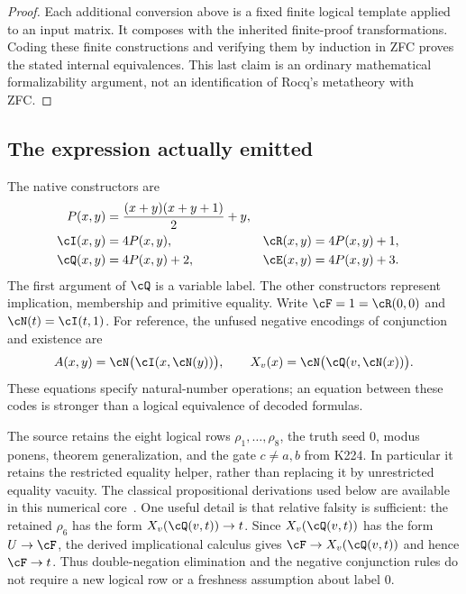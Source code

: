 \begin{proof}
Each additional conversion above is a fixed finite logical template
applied to an input matrix.  It composes with the inherited finite-proof
transformations.  Coding these finite constructions and verifying them
by induction in ZFC proves the stated internal equivalences.  This last
claim is an ordinary mathematical formalizability argument, not an
identification of Rocq's metatheory with ZFC.
\end{proof}

\subsection{The expression actually emitted}
\label{sec:literal-ks}

The native constructors are
\begin{align*}
 P(x,y)&=\frac{(x+y)(x+y+1)}2+y,\\
 \cI(x,y)&=4P(x,y), & \cR(x,y)&=4P(x,y)+1,\\
 \cQ(x,y)&=4P(x,y)+2, & \cE(x,y)&=4P(x,y)+3.
\end{align*}
The first argument of $\cQ$ is a variable label.  The other constructors
represent implication, membership and primitive equality.  Write
$\cF=1=\cR(0,0)$ and $\cN(t)=\cI(t,1)$.  For reference, the unfused
negative encodings of conjunction and existence are
\[
 A(x,y)=\cN\bigl(\cI(x,\cN(y))\bigr),\qquad
 X_v(x)=\cN\bigl(\cQ(v,\cN(x))\bigr).
\]
These equations specify natural-number operations; an equation between
these codes is stronger than a logical equivalence of decoded formulas.

The source retains the eight logical rows $\rho_1,\ldots,\rho_8$, the
truth seed $0$, modus ponens, theorem generalization, and the gate
$c\ne a,b$ from K224.  In particular it retains the restricted equality
helper, rather than replacing it by unrestricted equality vacuity.
The classical propositional derivations used below are available in
this numerical core~\cite{klogic,k224}.  One useful detail is that
relative falsity is sufficient: the retained $\rho_6$ has the form
$X_v(\cQ(v,t))\to t$.  Since $X_v(\cQ(v,t))$ has the form $U\to\cF$,
the derived implicational calculus gives
$\cF\to X_v(\cQ(v,t))$ and hence $\cF\to t$.  Thus double-negation
elimination and the negative conjunction rules do not require a new
logical row or a freshness assumption about label $0$.


